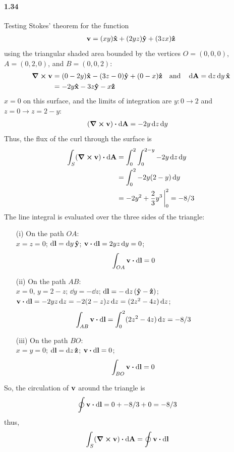 \documentclass[../main.tex]{subfiles}
\begin{document}
\paragraph{1.34}
Testing Stokes' theorem for the function
\begin{align*}
    \vb{v} = (xy) \vu{x} + (2yz) \vu{y} + (3zx)\vu{z}
\end{align*}
using the triangular shaded area bounded by the vertices
$O = (0,0,0)$, $A = (0,2,0)$, and $B = (0,0,2)$:
\begin{align*}
    \curl{\vb{v}} &= (0 - 2y) \vu{x} - (3z - 0) \vu{y} + (0 - x) \vu{z}
                                                        \qand \dd{\vb{A}} = \dd{z}\dd{y} \vu{x} \\
                  &= -2y \vu{x} - 3z \vu{y} - x \vu{z}
\end{align*}
$x=0$ on this surface, and the limits of integration are $y: 0 \to 2$ and $z = 0 \to z = 2 - y$:
\begin{align*}
    (\curl{\vb{v}}) \vdot \dd{\vb{A}} &= -2y \dd{z}\dd{y}
\end{align*}
Thus, the flux of the curl through the surface is
\begin{align*}
    \int_S (\curl{\vb{v}}) \vdot \dd{\vb{A}} &= \int_0^2 \int_0^{2-y} -2y \dd{z}\dd{y} \\
    &= \int_0^2 -2y(2-y) \dd{y} \\
    &= -2y^2 + \frac{2}{3} y^3 \eval_0^2 = -8/3
\end{align*}
The line integral is evaluated over the three sides of the triangle:
\begin{enumerate}
    \item [(i)] On the path $OA$: \\
    $x = z = 0$; $\dd{\vb{l}} = \dd{y} \vu{y}$; $\vb{v} \vdot \dd{\vb{l}} = 2yz \dd{y} = 0$;
    \begin{align*}
        \int_{OA} \vb{v} \vdot \dd{\vb{l}} &= 0
    \end{align*}
    \item [(ii)] On the path $AB$: \\
    $x = 0$, $y = 2 - z$; $\dd{y} = -\dd{z}$; $\dd{\vb{l}} = -\dd{z}(\vu{y} - \vu{z})$;
    $\vb{v} \vdot \dd{\vb{l}} = -2yz \dd{z} = -2(2 - z)z \dd{z} = (2z^2 - 4z) \dd{z}$;
    \begin{align*}
        \int_{AB} \vb{v} \vdot \dd{\vb{l}} &= \int_0^2 (2z^2 - 4z) \dd{z} = -8/3
    \end{align*}
    \item [(iii)] On the path $BO$: \\
    $x = y = 0$; $\dd{\vb{l}} = \dd{z} \vu{z}$; $\vb{v} \vdot \dd{\vb{l}} = 0$;
    \begin{align*}
        \int_{BO} \vb{v} \vdot \dd{\vb{l}} &= 0
    \end{align*}
\end{enumerate}
So, the circulation of $\vb{v}$ around the triangle is
\begin{align*}
    \oint \vb{v} \vdot \dd{\vb{l}} &= 0 + -8/3 + 0 = -8/3
\end{align*}
thus,
\begin{align*}
    \int_S (\curl{\vb{v}}) \vdot \dd{\vb{A}} &= \oint \vb{v} \vdot \dd{\vb{l}}
\end{align*}
\end{document}
